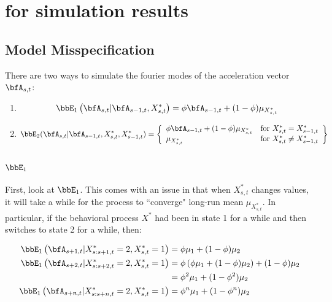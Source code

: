 
\iffalse

\section{for simulation results}

\subsection{Model Misspecification}

There are two ways to simulate the fourier modes of the acceleration vector $\bfA_{s,t}$:

\begin{enumerate}
	\item $$\bbE_1\left(\bfA_{s,t} | \bfA_{s-1,t}, X^*_{s,t}\right) = \phi \bfA_{s-1,t} + (1-\phi) \mu_{X^*_{s,t}} $$
	
	\item $$\bbE_2(\bfA_{s,t} | \bfA_{s-1,t}, X^*_{s,t}, X^*_{s-1,t}) = \left\{\begin{array}{lr}
	\phi \bfA_{s-1,t} + (1-\phi) \mu_{X^*_{s,t}} & \text{for } X^*_{s,t} = X^*_{s-1,t}\\
	\mu_{X^*_{s,t}} & \text{for } X^*_{s,t} \neq X^*_{s-1,t}
	\end{array}\right\}$$
\end{enumerate}

\subsubsection{$\bbE_1$}

First, look at $\bbE_1$. This comes with an issue in that when $X^*_{s,t}$ changes values, it will take a while for the process to ``converge" long-run mean $\mu_{X^*_{s,t}}$. In particular, if the behavioral process $X^*$ had been in state 1 for a while and then switches to state 2 for a while, then:

\begin{align*}
	\bbE_1\left(\bfA_{s+1,t}|X^*_{s:s+1,t} = 2, X^*_{s,t} = 1\right) &=  \phi \mu_1 + (1-\phi) \mu_2 \\
	\bbE_1\left(\bfA_{s+2,t}|X^*_{s:s+2,t} = 2, X^*_{s,t} = 1\right) &= \phi\left( \phi \mu_1 + (1-\phi) \mu_2\right) + (1-\phi)\mu_2 \\
	&= \phi^2 \mu_1 + (1-\phi^2) \mu_2\\
	\bbE_1\left(\bfA_{s+n,t}|X^*_{s:s+n,t} = 2, X^*_{s,t} = 1\right) &=  \phi^n \mu_1 + (1-\phi^n) \mu_2 \\
\end{align*}

